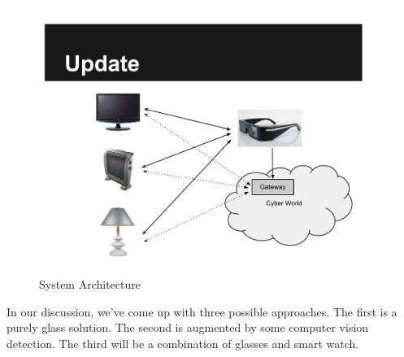 
\begin{figure}
  \centering
  \includegraphics[width=\linewidth]{../figs/sysarch.pdf}
  \caption{System Architecture}
  \label{fig:sysarch}
\end{figure}


In our discussion, we've come up with three possible approaches. The first is a purely glass solution. The second is augmented by some computer vision detection. The third  will be a combination of glasses and smart watch. 





